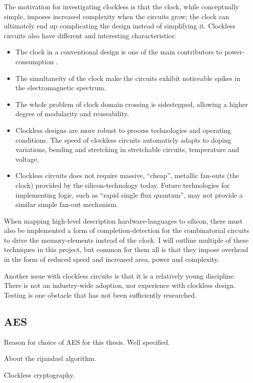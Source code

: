 The motivation for investigating clockless is that the clock, while
conceptually simple, imposes increased complexity when the circuits
grow; the clock can ultimately end up complicating the design instead
of simplifying it. Clockless circuits also have different and
interesting characteristics: \begin{itemize}

\item The clock in a conventional design is one of the main
  contributors to power-consumption \cite{tiwari1998reducing}.

\item The simultaneity of the clock make the circuits exhibit
  noticeable spikes in the electromagnetic spectrum.

\item The whole problem of clock domain crossing is sidestepped,
  allowing a higher degree of modularity and reuseability.

\item Clockless designs are more robust to process technologies and
  operating conditions. The speed of clockless circuits automaticly
  adapts to doping variations, bending and stretching in stretchable
  circuits, temperature and voltage.

\item Clockless circuits does not require massive, ``cheap'', metallic
  fan-outs (the clock) provided by the silicon-technology today. Future
  technologies for implementing logic, such as ``rapid single flux
  quantum'', may not provide a similar simple fan-out mechanism.
\end{itemize}

When mapping high-level description hardware-languages to silicon,
there must also be implemented a form of completion-detection for the
combinatorial circuits to drive the memory-elements instead of the
clock. I will outline multiple of these techniques in this project,
but common for them all is that they impose overhead in the form of
reduced speed and increased area, power and complexity.

Another issue with clockless circuits is that it is a relatively young
discipline. There is not an industry-wide adoption, nor experience
with clockless design. Testing is one obstacle that has not been
sufficiently researched. 

\subsection{AES}

Reason for choice of AES for this thesis. Well specified.

About the rijandael algorithm.

Clockless cryptography.
